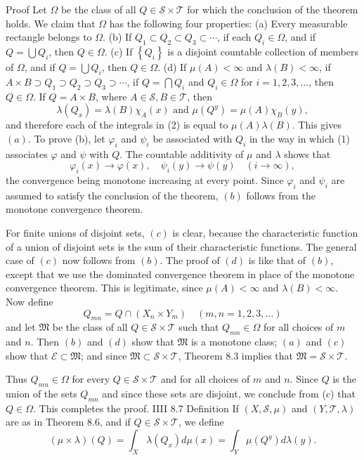 Proof Let $\Omega$ be the class of all $Q \in \mathscr{S} \times \mathscr{T}$ for which the conclusion of the theorem holds. We claim that $\Omega$ has the following four properties:
(a) Every measurable rectangle belongs to $\Omega$.
(b) If $Q_1 \subset Q_2 \subset Q_3 \subset \cdots$, if each $Q_i \in \Omega$, and if $Q=\bigcup Q_i$, then $Q \in \Omega$.
(c) If $\left\{Q_i\right\}$ is a disjoint countable collection of members of $\Omega$, and if $Q=\bigcup Q_i$, then $Q \in \Omega$.
(d) If $\mu(A)<\infty$ and $\lambda(B)<\infty$, if $A \times B \supset Q_1 \supset Q_2 \supset Q_3 \supset \cdots$, if $Q=\bigcap Q_i$ and $Q_i \in \Omega$ for $i=1,2,3, \ldots$, then $Q \in \Omega$.
If $Q=A \times B$, where $A \in \mathscr{S}, B \in \mathscr{T}$, then
$$
\lambda\left(Q_x\right)=\lambda(B) \chi_A(x) \text { and } \mu\left(Q^y\right)=\mu(A) \chi_B(y),
$$
and therefore each of the integrals in (2) is equal to $\mu(A) \lambda(B)$. This gives $(a)$.
To prove (b), let $\varphi_i$ and $\psi_i$ be associated with $Q_i$ in the way in which (1) associates $\varphi$ and $\psi$ with $Q$. The countable additivity of $\mu$ and $\lambda$ shows that
$$
\varphi_i(x) \rightarrow \varphi(x), \quad \psi_i(y) \rightarrow \psi(y) \quad(i \rightarrow \infty),
$$
the convergence being monotone increasing at every point. Since $\varphi_i$ and $\psi_i$ are assumed to satisfy the conclusion of the theorem, $(b)$ follows from the monotone convergence theorem.

For finite unions of disjoint sets, $(c)$ is clear, because the characteristic function of a union of disjoint sets is the sum of their characteristic functions. The general case of $(c)$ now follows from $(b)$.
The proof of $(d)$ is like that of $(b)$, except that we use the dominated convergence theorem in place of the monotone convergence theorem. This is legitimate, since $\mu(A)<\infty$ and $\lambda(B)<\infty$.
Now define
$$
Q_{m n}=Q \cap\left(X_n \times Y_m\right) \quad(m, n=1,2,3, \ldots)
$$
and let $\mathfrak{M}$ be the class of all $Q \in \mathscr{S} \times \mathscr{T}$ such that $Q_{m n} \in \Omega$ for all choices of $m$ and $n$. Then $(b)$ and $(d)$ show that $\mathfrak{M}$ is a monotone class; $(a)$ and $(c)$ show that $\mathscr{E} \subset \mathfrak{M}$; and since $\mathfrak{M} \subset \mathscr{S} \times \mathscr{T}$, Theorem 8.3 implies that $\mathfrak{M}=\mathscr{S} \times \mathscr{T}$.

Thus $Q_{m n} \in \Omega$ for every $Q \in \mathscr{S} \times \mathscr{T}$ and for all choices of $m$ and $n$. Since $Q$ is the union of the sets $Q_{m n}$ and since these sets are disjoint, we conclude from (c) that $Q \in \Omega$. This completes the proof.
IIII
8.7 Definition If $(X, \mathscr{S}, \mu)$ and $(Y, \mathscr{T}, \lambda)$ are as in Theorem 8.6, and if $Q \in \mathscr{S} \times \mathscr{T}$, we define
$$
(\mu \times \lambda)(Q)=\int_X \lambda\left(Q_x\right) d \mu(x)=\int_Y \mu\left(Q^y\right) d \lambda(y) .
$$


